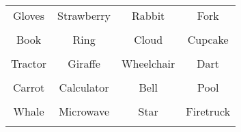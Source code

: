 \documentclass[12pt,a4paper]{article}
\begin{document}
\thispagestyle{empty}
\begin{table}[]
\centering
\Huge
\begin{tabular}{cccc}
 Gloves& Strawberry& Rabbit& Fork\\  & & & \\
 Book& Ring& Cloud& Cupcake\\  & & & \\
 Tractor& Giraffe& Wheelchair& Dart\\  & & & \\
 Carrot& Calculator& Bell& Pool\\  & & & \\
 Whale& Microwave& Star& Firetruck\\  & & & \\
\end{tabular}
\end{table}
\end{document}
